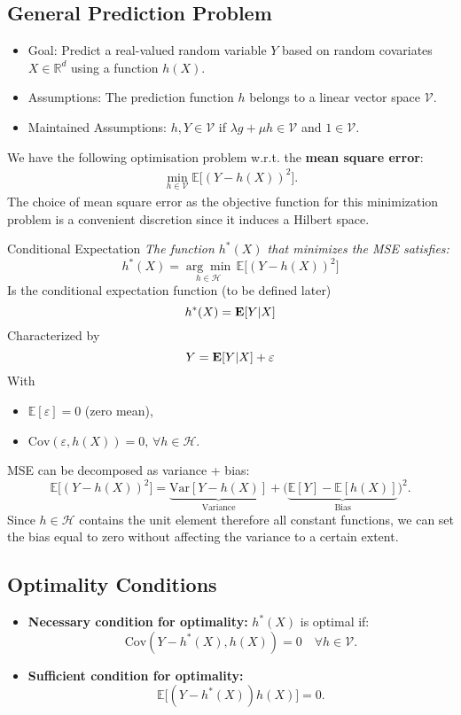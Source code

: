 \begin{prf}
\subsection{General Prediction Problem}
\begin{itemize}
    \item Goal: Predict a real-valued random variable $Y$ based on random covariates $X \in \mathbb{R}^d$ using a function $h(X)$.
    \item Assumptions: The prediction function $h$ belongs to a linear vector space $\mathcal{V}$. 
    \item Maintained Assumptions: $h, Y \in \mathcal{V}$ if $\lambda g + \mu h \in \mathcal{V}$ and $1 \in \mathcal{V}$.
\end{itemize}
We have the following optimisation problem w.r.t. the \textbf{mean square error}: 
\begin{align*}
\min_{h \in \mathcal{V}} \mathbb{E} \big[ (Y - h(X))^2 \big].
\end{align*}
The choice of mean square error as the objective function for this minimization problem is a convenient discretion since it induces a Hilbert space. 

\begin{thm}{Conditional Expectation}
\textit{The function $h^*(X)$ that minimizes the MSE satisfies:}
\[
h^*(X) = \underset{h \in \mathscr{H}}{\arg \min} \, \mathbb{E} \big[ (Y - h(X))^2 \big]
\]
Is the conditional expectation function (to be defined later)
$$h^*(X) = \vb{E}[Y|X]$$
Characterized by 
$$Y = \vb{E}[Y|X] + {\varepsilon}$$
With
\begin{itemize}
    \item $\mathbb{E}[\varepsilon] = 0$ (zero mean),
    \item $\text{Cov}(\varepsilon, h(X)) = 0, \, \forall h \in \mathscr{H}$.
\end{itemize}	
\end{thm}

\begin{rmk}
MSE can be decomposed as variance + bias:
\[
\mathbb{E} \big[ (Y - h(X))^2 \big] = \underbrace{\text{Var}[Y - h(X)]}_{\text{Variance}} + \big( \underbrace{\mathbb{E}[Y] - \mathbb{E}[h(X)]}_{\text{Bias}} \big)^2.
\]
Since $h\in \mathscr{H}$ contains the unit element therefore all constant functions, we can set the bias equal to zero without affecting the variance to a certain extent. 
\end{rmk}

\subsection{Optimality Conditions}
\begin{itemize}
    \item \textbf{Necessary condition for optimality:} $h^*(X)$ is optimal if:
    \[
    \text{Cov}(Y - h^*(X), h(X)) = 0 \quad \forall h \in \mathcal{V}.
    \]
    \item \textbf{Sufficient condition for optimality:}
    \[
    \mathbb{E} \big[ (Y - h^*(X)) h(X) \big] = 0.
    \]
\end{itemize}


\end{prf}

